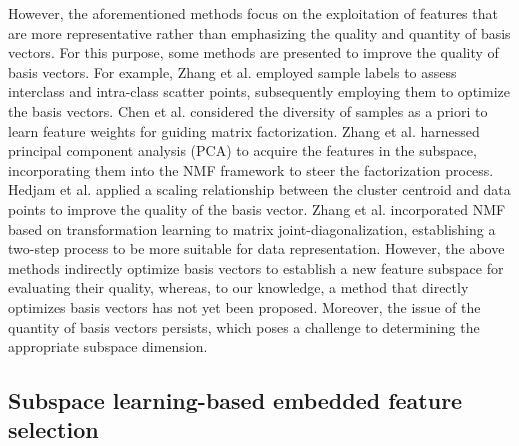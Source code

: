 \documentclass[a4paper,fleqn]{cas-sc}
\begin{document}
However, the aforementioned methods focus on the exploitation of features that are more representative rather than emphasizing the quality and quantity of basis vectors. For this purpose, some methods are presented to improve the quality of basis vectors. For example, Zhang et al. \cite{45} employed sample labels to assess interclass and intra-class scatter points, subsequently employing them to optimize the basis vectors. Chen et al. \cite{46} considered the diversity of samples as a priori to learn feature weights for guiding matrix factorization. Zhang et al. \cite{47} harnessed principal component analysis (PCA) to acquire the features in the subspace, incorporating them into the NMF framework to steer the factorization process. Hedjam et al. \cite{48} applied a scaling relationship between the cluster centroid and data points to improve the quality of the basis vector. Zhang et al. \cite{49} incorporated NMF based on transformation learning to matrix joint-diagonalization, establishing a two-step process to be more suitable for data representation. However, the above methods indirectly optimize basis vectors to establish a new feature subspace for evaluating their quality, whereas, to our knowledge, a method that directly optimizes basis vectors has not yet been proposed. Moreover, the issue of the quantity of basis vectors persists, which poses a challenge to determining the appropriate subspace dimension.

\subsection{Subspace learning-based embedded feature selection}
\end{document}
